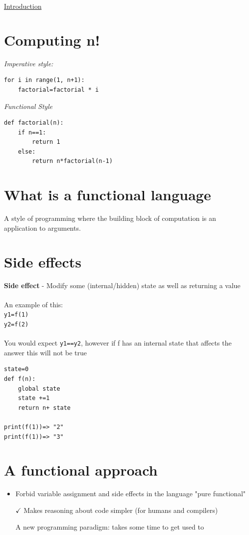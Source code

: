 \documentclass{article}[18pt]
\newcommand{\xmark}{\ding{55}}%
\begin{document}
\begin{center}
\underline{\huge Introduction}
\end{center}
\section{Computing n!}
\textit{Imperative style:}
\begin{verbatim}
for i in range(1, n+1):
	factorial=factorial * i
\end{verbatim}
\textit{Functional Style}
\begin{verbatim}
def factorial(n):
	if n==1:
		return 1
	else:
		return n*factorial(n-1)
\end{verbatim}
\section{What is a functional language}
A style of programming where the building block of computation is an application to arguments. 
\section{Side effects}
\textbf{Side effect} - Modify some (internal/hidden) state as well as returning a value\\
\\
An example of this:\\
\texttt{y1=f(1)}\\
\texttt{y2=f(2)}\\
\\
You would expect \texttt{y1==y2}, however if f has an internal state that affects the answer this will not be true
\begin{verbatim}
state=0
def f(n):
	global state
	state +=1
	return n+ state
	
print(f(1))=> "2"
print(f(1))=> "3"
\end{verbatim}
\section{A functional approach}
\begin{itemize}
	\item Forbid variable assignment and side effects in the language "pure functional"
	\item [$\checkmark$] Makes reasoning about code simpler (for humans and compilers)
	\item [\xmark] A new programming paradigm: takes some time to get used to
\end{itemize}
\end{document}
